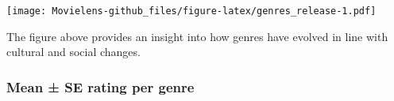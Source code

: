 \documentclass[]{article}
\newenvironment{Shaded}{\begin{snugshade}}{\end{snugshade}}
\newcommand{\DataTypeTok}[1]{\textcolor[rgb]{0.13,0.29,0.53}{#1}}
\newcommand{\DecValTok}[1]{\textcolor[rgb]{0.00,0.00,0.81}{#1}}
\newcommand{\KeywordTok}[1]{\textcolor[rgb]{0.13,0.29,0.53}{\textbf{#1}}}
\newcommand{\NormalTok}[1]{#1}
\newcommand{\OperatorTok}[1]{\textcolor[rgb]{0.81,0.36,0.00}{\textbf{#1}}}
\newcommand{\StringTok}[1]{\textcolor[rgb]{0.31,0.60,0.02}{#1}}
\begin{document}
\begin{Shaded}
\end{Shaded}

\texttt{[image: Movielens-github\_files/figure-latex/genres\_release-1.pdf]}

The figure above provides an insight into how genres have evolved in
line with cultural and social changes.

\hypertarget{mean-se-rating-per-genre}{%
\subsubsection{Mean ± SE rating per
genre}\label{mean-se-rating-per-genre}}

\begin{Shaded}
\end{Shaded}
\end{document}
